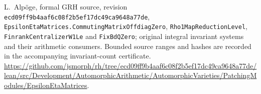 L.~Alp\"oge, formal GRH source, revision
\texttt{ecd09ff9b4aaf6c08f2b5ef17dc49ca9648a77de},
\texttt{EpsilonEtaMatrices.CommutingMatrixOffdiagZero},
\texttt{Rho1MapReductionLevel}, \texttt{FinrankCentralizerW1Le}
and \texttt{FixBdQZero}; original integral invariant systems and
their arithmetic consumers. Bounded source ranges and hashes are
recorded in the accompanying invariant-count certificate.
\url{https://github.com/jsmorph/rh/tree/ecd09ff9b4aaf6c08f2b5ef17dc49ca9648a77de/lean/src/Development/AutomorphicArithmetic/AutomorphicVarieties/PatchingModules/EpsilonEtaMatrices}.
